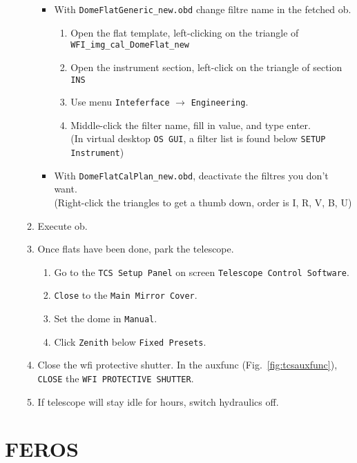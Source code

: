 \documentclass[11pt,fleqn]{book} %
\begin{document}
\begin{enumerate}
\begin{enumerate}
\begin{itemize}
            \item With \texttt{DomeFlatGeneric\_new.obd} change filtre name in the fetched 
           \gls{ob}.
              \begin{enumerate}
                 \item Open the flat template, left-clicking on the triangle of \texttt{WFI\_img\_cal\_DomeFlat\_new}
                 \item Open the instrument section, left-click on the triangle of section \texttt{INS}
                 \item Use menu \texttt{Inteferface} $\rightarrow$ \texttt{Engineering}.
                 \item Middle-click the filter name, fill in value, and type enter.\\
                      (In virtual desktop \texttt{OS GUI}, a filter list is found below \texttt{SETUP Instrument})
              \end{enumerate}
            \item With \texttt{DomeFlatCalPlan\_new.obd}, deactivate the filtres you don't want.\\
               (Right-click the triangles to get a thumb down, order is  I, R, V, B, U)
         \end{itemize}
     \item Execute \gls{ob}.
     \item Once flats have been done, park the telescope.
     \begin{enumerate}
       \item Go to the \texttt{TCS Setup Panel} on screen \texttt{Telescope Control Software}.
       \item \texttt{Close} to the \texttt{Main Mirror Cover}.
       \item Set the dome in \texttt{Manual}.
       \item Click \texttt{Zenith} below \texttt{Fixed Presets}.
     \end{enumerate}
     \item Close the \gls{wfi} protective shutter.
           In the \gls{auxfunc} (Fig.~\ref{fig:tcsauxfunc}), \texttt{CLOSE} the \texttt{WFI PROTECTIVE SHUTTER}.
     \item If telescope will stay idle for hours, switch hydraulics off.
   \end{enumerate}
\end{enumerate}


\section{FEROS}
\end{document}
